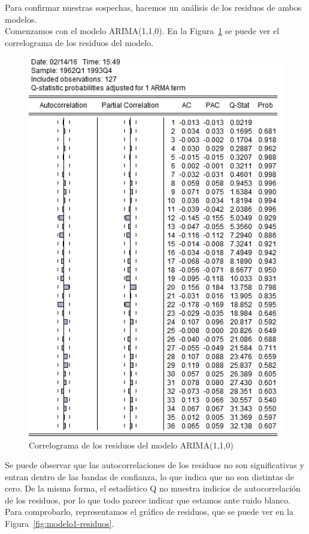 \documentclass[12pt,a4paper,twoside,openright,titlepage,final]{article}
\begin{document}
Para confirmar nuestras sospechas, hacemos un análisis de los residuos de ambos modelos. \\

Comenzamos con el modelo ARIMA(1,1,0). En la Figura~\ref*{fig:modelo1-residuos-correlograma} se puede ver el correlograma de los residuos del modelo.\\

\begin{figure}[tbph!]
	\centering
	\includegraphics[width=0.7\linewidth]{imagenes/empleo/modelo1-residuos-correlograma.png}
	\caption{Correlograma de los residuos del modelo ARIMA(1,1,0)}
	\label{fig:modelo1-residuos-correlograma}
\end{figure}

Se puede observar que las autocorrelaciones de los residuos no son significativas y entran dentro de las bandas de confianza, lo que indica que no son distintas de cero. De la misma forma, el estadístico Q no muestra indicios de autocorrelación de los residuos, por lo que todo parece indicar que estamos ante ruido blanco. Para comprobarlo, representamos el gráfico de residuos, que se puede ver en la Figura~\ref{fig:modelo1-residuos}.\\
\end{document}
